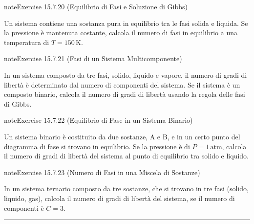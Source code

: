 \documentclass[letterpaper,10pt,italian]{jupyterBook}
\begin{document}
\begin{sphinxadmonition}{note}{Exercise 15.7.20 (Equilibrio di Fasi e Soluzione di Gibbs)}



\sphinxAtStartPar
Un sistema contiene una sostanza pura in equilibrio tra le fasi solida e liquida. Se la pressione è mantenuta costante, calcola il numero di fasi in equilibrio a una temperatura di \(T = 150 \, \text{K}\).
\end{sphinxadmonition}
 \label{exercise:ch/thermodynamics/principles-problems-exercise-20}

\begin{sphinxadmonition}{note}{Exercise 15.7.21 (Fasi di un Sistema Multicomponente)}



\sphinxAtStartPar
In un sistema composto da tre fasi, solido, liquido e vapore, il numero di gradi di libertà è determinato dal numero di componenti del sistema. Se il sistema è un composto binario, calcola il numero di gradi di libertà usando la regola delle fasi di Gibbs.
\end{sphinxadmonition}
 \label{exercise:ch/thermodynamics/principles-problems-exercise-21}

\begin{sphinxadmonition}{note}{Exercise 15.7.22 (Equilibrio di Fase in un Sistema Binario)}



\sphinxAtStartPar
Un sistema binario è costituito da due sostanze, A e B, e in un certo punto del diagramma di fase si trovano in equilibrio. Se la pressione è di \(P = 1 \, \text{atm}\), calcola il numero di gradi di libertà del sistema al punto di equilibrio tra solido e liquido.
\end{sphinxadmonition}
 \label{exercise:ch/thermodynamics/principles-problems-exercise-22}

\begin{sphinxadmonition}{note}{Exercise 15.7.23 (Numero di Fasi in una Miscela di Sostanze)}



\sphinxAtStartPar
In un sistema ternario composto da tre sostanze, che si trovano in tre fasi (solido, liquido, gas), calcola il numero di gradi di libertà del sistema, se il numero di componenti è \(C = 3\).
\end{sphinxadmonition}


\bigskip\hrule\bigskip
\end{document}
